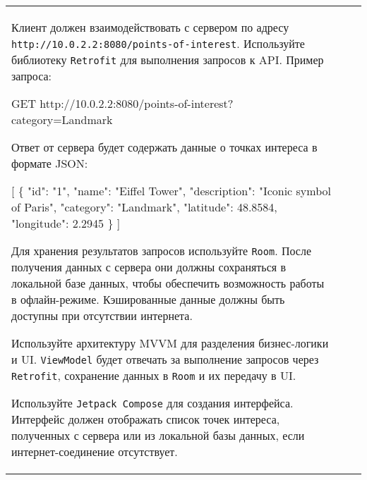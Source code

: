 \documentclass[a4paper]{article}
\begin{document}
\begin{tabular}{!{\vrule width 2pt}p{5cm}|p{6cm}|p{4cm}!{\vrule width 2pt}}
{\begin{minipage}{16cm}
\begin{enumerate}

Клиент должен взаимодействовать с сервером по адресу \texttt{http://10.0.2.2:8080/points-of-interest}. Используйте библиотеку \texttt{Retrofit} для выполнения запросов к API. Пример запроса:

 GET http://10.0.2.2:8080/points-of-interest?category=Landmark 

Ответ от сервера будет содержать данные о точках интереса в формате JSON:

 [ \{ "id": "1", "name": "Eiffel Tower", 
    "description": "Iconic symbol of Paris", "category": "Landmark", 
    "latitude": 48.8584, "longitude": 2.2945 \} ] 


Для хранения результатов запросов используйте \texttt{Room}. После получения данных с сервера они должны сохраняться в локальной базе данных, чтобы обеспечить возможность работы в офлайн-режиме. Кэшированные данные должны быть доступны при отсутствии интернета.


Используйте архитектуру MVVM для разделения бизнес-логики и UI. \texttt{ViewModel} будет отвечать за выполнение запросов через \texttt{Retrofit}, сохранение данных в \texttt{Room} и их передачу в UI.


Используйте \texttt{Jetpack Compose} для создания интерфейса. Интерфейс должен отображать список точек интереса, полученных с сервера или из локальной базы данных, если интернет-соединение отсутствует.



\end{enumerate}
\end{minipage}}
\end{tabular}
\end{document}
